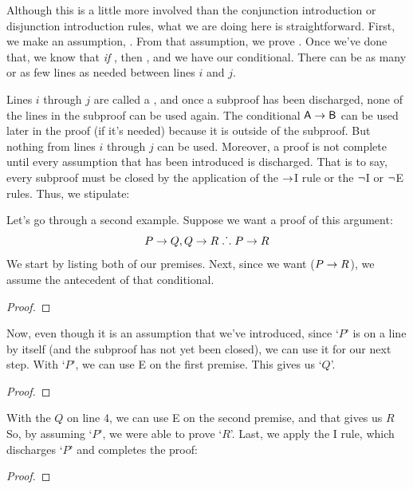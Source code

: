 Although this is a little more involved than the conjunction introduction or disjunction introduction rules, what we are doing here is straightforward. First, we make an assumption, . From that assumption, we prove . Once we've done that, we know that \textit{if} , then , and we have our conditional. 
\noindent There can be as many or as few lines as needed between lines $i$ and $j$. 

Lines $i$ through $j$ are called a , and once a subproof has been discharged, none of the lines in the subproof can be used again. The conditional $\mathsf{A}\rightarrow\mathsf{B}$ can be used later in the proof (if it's needed) because it is outside of the subproof. But nothing from lines $i$ through $j$ can be used. Moreover, a proof is not complete until every assumption that has been introduced is discharged. That is to say, every subproof must be closed by the application of the $\rightarrow$I rule or the ${\neg}$I or ${\neg}$E rules.
Thus, we stipulate:

Let's go through a second example. Suppose we want a proof of this argument:
	$$P \rightarrow Q, Q \rightarrow R \mathrel{\ldotp\dot{}\,\ldotp} P \rightarrow R$$
We start by listing both of our premises. Next, since we want ($P \rightarrow R$), we assume the antecedent of that conditional. 
\begin{proof}
	 
	 
	\open
		 
	\close
\end{proof}
Now, even though it is an assumption that we've introduced, since `$P$' is on a line by itself (and the subproof has not yet been closed), we can use it for our next step. With `$P$', we can use {\eif}E on the first premise. This gives us `$Q$'. 
\begin{proof}
	 
	 
	\open
	\close
\end{proof}
With the $Q$ on line 4, we can use {\eif}E on the second premise, and that gives us $R$ So, by assuming `$P$', we were able to prove `$R$'. Last, we apply the {\eif}I rule, which discharges `$P$' and completes the proof:
\label{HSproof}
\begin{proof}
	 
	 
	\open
	\close
\end{proof}


